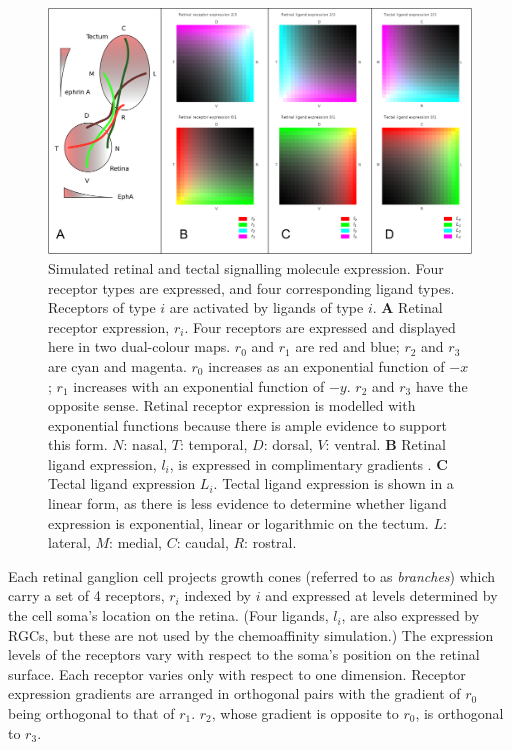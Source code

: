 \documentclass[11pt, a4paper]{article}
\begin{document}
\begin{figure}
\includegraphics[width=\linewidth]{./images/expressions_fig.png}
\caption{Simulated retinal and tectal signalling molecule expression. Four
receptor types are expressed, and four corresponding ligand types. Receptors
of type $i$ are activated by ligands of type $i$.
%
\textbf{A} Retinal receptor expression, $r_i$. Four receptors are expressed and
displayed here in two dual-colour maps. $r_0$ and $r_1$ are red and blue;
$r_2$ and $r_3$ are cyan and magenta. $r_0$ increases as an exponential
function of $-x$; $r_1$ increases with an exponential function of $-y$. $r_2$
and $r_3$ have the opposite sense. Retinal receptor expression is modelled
with exponential functions because there is ample evidence to support this
form. $N$: nasal, $T$: temporal, $D$: dorsal, $V$: ventral.
%
\textbf{B} Retinal ligand expression, $l_i$, is expressed in complimentary
gradients \citep{hornberger_modulation_1999}.
%
\textbf{C} Tectal ligand expression $L_i$. Tectal ligand expression is shown in a linear form,
as there is less evidence to determine whether ligand expression is
exponential, linear or logarithmic on the tectum.
$L$: lateral, $M$: medial, $C$: caudal, $R$: rostral.
}
\label{f:ex}
\end{figure}

Each retinal ganglion cell projects growth cones (referred to
as \emph{branches}) which carry a set of 4 receptors, $r_i$ indexed by $i$ and
expressed at levels determined by the cell soma's location on the
retina. (Four ligands, $l_i$, are also expressed by RGCs, but these are not
used by the chemoaffinity simulation.) The expression levels of the receptors
vary with respect to the soma's position on the retinal surface. Each receptor
varies only with respect to one dimension.  Receptor expression gradients are
arranged in orthogonal pairs with the gradient of $r_0$ being orthogonal to
that of $r_1$. $r_2$, whose gradient is opposite to $r_0$, is orthogonal to
$r_3$.
\end{document}
